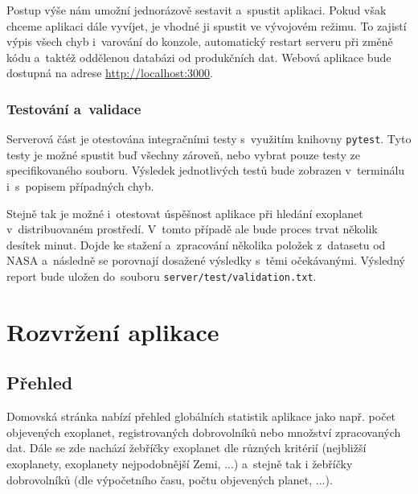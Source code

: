 \documentclass[a4paper,12pt]{article}
\def\code#1{\texttt{#1}}
\begin{document}
{{{{{{{{{{Postup výše nám umožní jednorázově sestavit a~spustit aplikaci. Pokud však chceme aplikaci dále vyvíjet, je vhodné ji spustit ve vývojovém režimu. To zajistí výpis všech chyb i~varování do konzole, automatický restart serveru při změně kódu a~taktéž oddělenou databázi od produkčních dat. Webová aplikace bude dostupná na adrese \url{http://localhost:3000}.



\vspace{-20pt}

\subsubsection{Testování a~validace}

Serverová část je otestována integračními testy s~využitím knihovny \code{pytest}. Tyto testy je možné spustit buď všechny zároveň, nebo vybrat pouze testy ze specifikovaného souboru. Výsledek jednotlivých testů bude zobrazen v~terminálu i~s~popisem případných chyb.



Stejně tak je možné i~otestovat úspěšnost aplikace při hledání exoplanet v~distribuovaném prostředí. V~tomto případě ale bude proces trvat několik desítek minut. Dojde ke stažení a~zpracování několika položek z~datasetu od NASA a~následně se porovnají dosažené výsledky s~těmi očekávanými. Výsledný report bude uložen do~souboru \code{server/test/validation.txt}.



\section{Rozvržení aplikace}

\subsection{Přehled}

Domovská stránka nabízí přehled globálních statistik aplikace jako např. počet objevených exoplanet, registrovaných dobrovolníků nebo množství zpracovaných dat. Dále se zde nachází žebříčky exoplanet dle různých kritérií (nejbližší exoplanety, exoplanety nejpodobnější Zemi, ...) a~stejně tak i žebříčky dobrovolníků (dle výpočetního času, počtu objevených planet, ...).

}}}}}}}}}}
\end{document}

